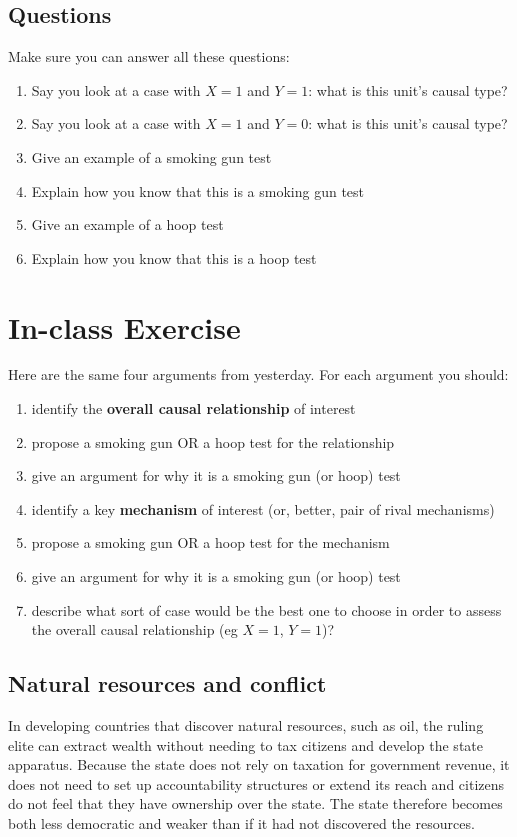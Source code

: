 \documentclass[11pt]{article}
\begin{document}
\subsection{Questions}
Make sure you can answer all these questions:
\begin{enumerate}
\item	Say you look at a case with $X=1$ and $Y=1$: what is this unit's causal type?
\item	Say you look at a case with $X=1$ and $Y=0$: what is this unit's causal type?
\item	Give an example of a smoking gun test
\item   Explain how you know that this is a smoking gun test
\item	Give an example of a hoop test
\item   Explain how you know that this is a hoop test
 
\end{enumerate}

 \newpage

\section{In-class Exercise}

Here are the same four arguments from yesterday. For each argument you should:
\begin{enumerate}
\item identify the \textbf{overall causal relationship }of interest
\item propose a smoking gun OR a hoop test for the relationship
\item give an argument for why it is a smoking gun (or hoop) test
\item identify a key  \textbf{mechanism} of interest (or, better, pair of rival mechanisms)
\item propose a smoking gun OR a hoop test for the mechanism
\item give an argument for why it is a smoking gun (or hoop) test
\item describe what sort of case would be the best one to choose in order to assess the overall causal relationship (eg $X = 1$, $Y = 1$)? 
\end{enumerate}
\small
\subsection{Natural resources and conflict}
In developing countries that discover natural resources, such as oil, the ruling elite can extract wealth without needing to tax citizens and develop the state apparatus. Because the state does not rely on taxation for government revenue, it does not need to set up accountability structures or extend its reach and citizens do not feel that they have ownership over the state. The state therefore becomes both less democratic and weaker than if it had not discovered the resources.
\end{document}
